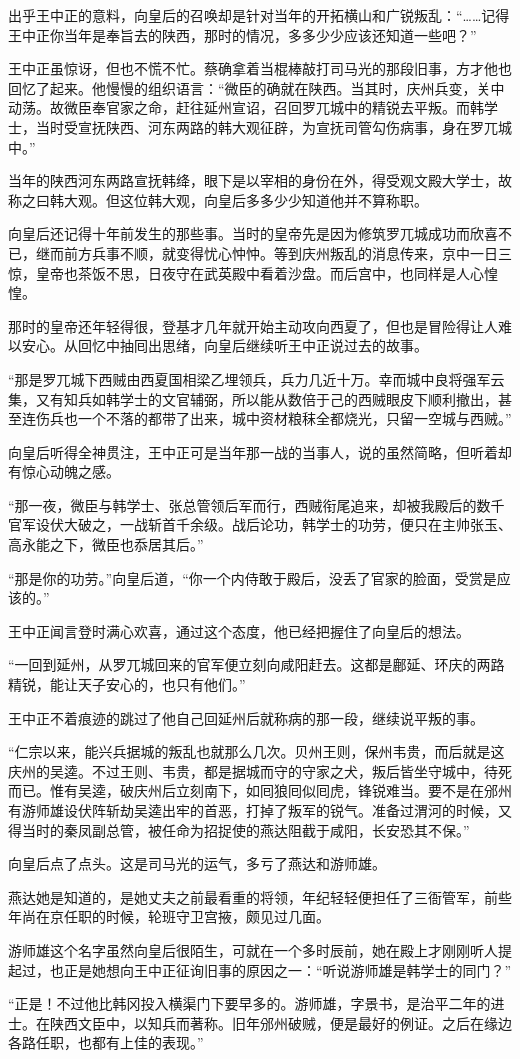 出乎王中正的意料，向皇后的召唤却是针对当年的开拓横山和广锐叛乱：“……记得王中正你当年是奉旨去的陕西，那时的情况，多多少少应该还知道一些吧？”

王中正虽惊讶，但也不慌不忙。蔡确拿着当棍棒敲打司马光的那段旧事，方才他也回忆了起来。他慢慢的组织语言：“微臣的确就在陕西。当其时，庆州兵变，关中动荡。故微臣奉官家之命，赶往延州宣诏，召回罗兀城中的精锐去平叛。而韩学士，当时受宣抚陕西、河东两路的韩大观征辟，为宣抚司管勾伤病事，身在罗兀城中。”

当年的陕西河东两路宣抚韩绛，眼下是以宰相的身份在外，得受观文殿大学士，故称之曰韩大观。但这位韩大观，向皇后多多少少知道他并不算称职。

向皇后还记得十年前发生的那些事。当时的皇帝先是因为修筑罗兀城成功而欣喜不已，继而前方兵事不顺，就变得忧心忡忡。等到庆州叛乱的消息传来，京中一日三惊，皇帝也茶饭不思，日夜守在武英殿中看着沙盘。而后宫中，也同样是人心惶惶。

那时的皇帝还年轻得很，登基才几年就开始主动攻向西夏了，但也是冒险得让人难以安心。从回忆中抽囘出思绪，向皇后继续听王中正说过去的故事。

“那是罗兀城下西贼由西夏国相梁乙埋领兵，兵力几近十万。幸而城中良将强军云集，又有知兵如韩学士的文官辅弼，所以能从数倍于己的西贼眼皮下顺利撤出，甚至连伤兵也一个不落的都带了出来，城中资材粮秣全都烧光，只留一空城与西贼。”

向皇后听得全神贯注，王中正可是当年那一战的当事人，说的虽然简略，但听着却有惊心动魄之感。

“那一夜，微臣与韩学士、张总管领后军而行，西贼衔尾追来，却被我殿后的数千官军设伏大破之，一战斩首千余级。战后论功，韩学士的功劳，便只在主帅张玉、高永能之下，微臣也忝居其后。”

“那是你的功劳。”向皇后道，“你一个内侍敢于殿后，没丢了官家的脸面，受赏是应该的。”

王中正闻言登时满心欢喜，通过这个态度，他已经把握住了向皇后的想法。

“一回到延州，从罗兀城回来的官军便立刻向咸阳赶去。这都是鄜延、环庆的两路精锐，能让天子安心的，也只有他们。”

王中正不着痕迹的跳过了他自己回延州后就称病的那一段，继续说平叛的事。

“仁宗以来，能兴兵据城的叛乱也就那么几次。贝州王则，保州韦贵，而后就是这庆州的吴逵。不过王则、韦贵，都是据城而守的守家之犬，叛后皆坐守城中，待死而已。惟有吴逵，破庆州后立刻南下，如囘狼囘似囘虎，锋锐难当。要不是在邠州有游师雄设伏阵斩劫吴逵出牢的首恶，打掉了叛军的锐气。准备过渭河的时候，又得当时的秦凤副总管，被任命为招捉使的燕达阻截于咸阳，长安恐其不保。”

向皇后点了点头。这是司马光的运气，多亏了燕达和游师雄。

燕达她是知道的，是她丈夫之前最看重的将领，年纪轻轻便担任了三衙管军，前些年尚在京任职的时候，轮班守卫宫掖，颇见过几面。

游师雄这个名字虽然向皇后很陌生，可就在一个多时辰前，她在殿上才刚刚听人提起过，也正是她想向王中正征询旧事的原因之一：“听说游师雄是韩学士的同门？”

“正是！不过他比韩冈投入横渠门下要早多的。游师雄，字景书，是治平二年的进士。在陕西文臣中，以知兵而著称。旧年邠州破贼，便是最好的例证。之后在缘边各路任职，也都有上佳的表现。”


